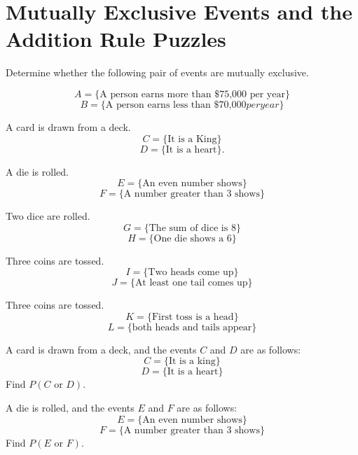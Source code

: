 \section{Mutually Exclusive Events and the Addition Rule Puzzles}

Determine whether the following pair of events are mutually exclusive.
\begin{puzzle}
    \[ A = \{\text{A person earns more than \$75,000 per year}\}\]
    \[B = \{\text{A person earns less than \$70,000} per year\}\]
\end{puzzle}

\begin{puzzle}
    A card is drawn from a deck.
    \[ C = \{\text{It is a King}\}\]
    \[D = \{\text{It is a heart}\}.\]
\end{puzzle}

\begin{puzzle}
    A die is rolled.
    \[ E = \{\text{An even number shows}\}\]
    \[F = \{\text{A number greater than 3 shows}\}\]
\end{puzzle}

\begin{puzzle}
    Two dice are rolled.
    \[ G = \{\text{The sum of dice is 8}\}\]
    \[H = \{\text{One die shows a 6}\}\]
\end{puzzle}

\begin{puzzle}
    Three coins are tossed.
    \[I = \{\text{Two heads come up}\}\]
    \[J = \{\text{At least one tail comes up}\}\]
\end{puzzle}

\begin{puzzle}
    Three coins are tossed.
    \[K = \{\text{First toss is a head}\}\]
    \[L = \{\text{both heads and tails appear}\}\]
\end{puzzle}

\begin{puzzle}
    A card is drawn from a deck, and the events \( C \) and \( D \) are as follows:
    \[ C = \{\text{It is a king}\}\]
    \[ D = \{\text{It is a heart}\}\]
    Find \( P(C \text{ or } D) \).
\end{puzzle}

\begin{puzzle}
    A die is rolled, and the events \( E \) and \( F \) are as follows:
    \[ E = \{\text{An even number shows}\}\]
    \[ F = \{\text{A number greater than 3 shows}\}\]
    Find \( P(E \text{ or } F) \).
\end{puzzle}

